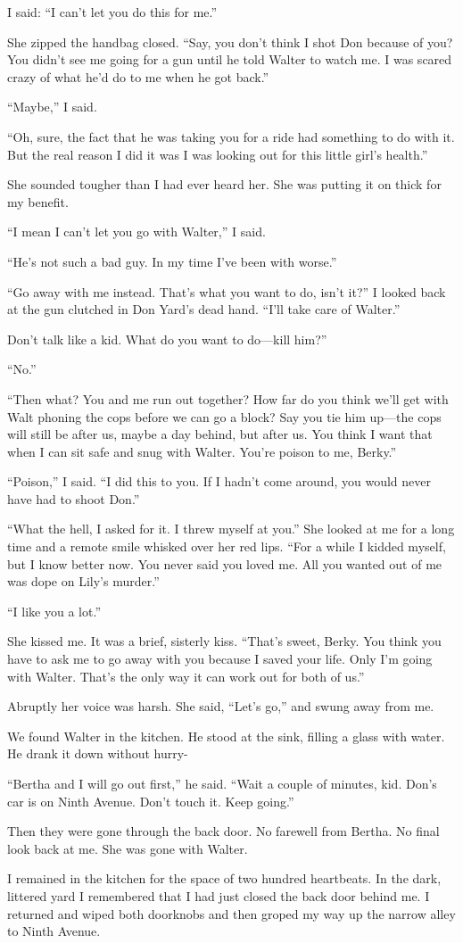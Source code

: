 {I said: “I can’t let you do this for me.”

She zipped the handbag closed. “Say, you don’t think I shot Don because of you? You didn’t see me going for a gun until he told Walter to watch me. I was scared crazy of what he’d do to me when he got back.”

“Maybe,” I said.

“Oh, sure, the fact that he was taking you for a ride had something to do with it. But the real reason I did it was I was looking out for this little girl’s health.”

She sounded tougher than I had ever heard her. She was putting it on thick for my benefit.

“I mean I can’t let you go with Walter,” I said.

“He’s not such a bad guy. In my time I’ve been with worse.”

“Go away with me instead. That’s what you want to do, isn’t it?” I looked back at the gun clutched in Don Yard’s dead hand. “I’ll take care of Walter.”

Don’t talk like a kid. What do you want to do—kill him?”

“No.”

“Then what? You and me run out together? How far do you think we’ll get with Walt phoning the cops before we can go a block? Say you tie him up—the cops will still be after us, maybe a day behind, but after us. You think I want that when I can sit safe and snug with Walter. You’re poison to me, Berky.”

“Poison,” I said. “I did this to you. If I hadn’t come around, you would never have had to shoot Don.”

“What the hell, I asked for it. I threw myself at you.” She looked at me for a long time and a remote smile whisked over her red lips. “For a while I kidded myself, but I know better now. You never said you loved me. All you wanted out of me was dope on Lily’s murder.”

“I like you a lot.”

She kissed me. It was a brief, sisterly kiss. “That’s sweet, Berky. You think you have to ask me to go away with you because I saved your life. Only I’m going with Walter. That’s the only way it can work out for both of us.”

Abruptly her voice was harsh. She said, “Let’s go,” and swung away from me.

We found Walter in the kitchen. He stood at the sink, filling a glass with water. He drank it down without hurry-

“Bertha and I will go out first,” he said. “Wait a couple of minutes, kid. Don’s car is on Ninth Avenue. Don’t touch it. Keep going.”

Then they were gone through the back door. No farewell from Bertha. No final look back at me. She was gone with Walter.

I remained in the kitchen for the space of two hundred heartbeats. In the dark, littered yard I remembered that I had just closed the back door behind me. I returned and wiped both doorknobs and then groped my way up the narrow alley to Ninth Avenue.

}

